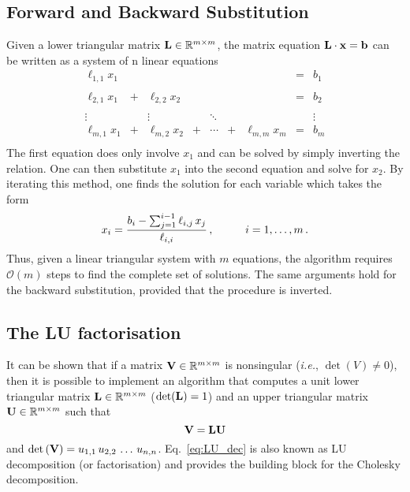 \subsection*{Forward and Backward Substitution}
Given a lower triangular matrix $\mathbf{L} \in \mathbb{R}^{m \times m}$, the matrix equation $\mathbf{L} \cdot \mathbf{x} = \mathbf{b}$ can be written as a system of n linear equations
\begin{equation}
\begin{matrix}
  \ell_{1,1} x_1 &   &                &   &        &   &                & = &    b_1 \\\\
  \ell_{2,1} x_1 & + & \ell_{2,2} x_2 &   &        &   &                & = &    b_2 \\\\
          \vdots &   &         \vdots &   & \ddots &   &                &   & \vdots \\
  \ell_{m,1} x_1 & + & \ell_{m,2} x_2 & + & \dotsb & + & \ell_{m,m} x_m & = &    b_m \\
\end{matrix}
\end{equation}
The first equation does only involve $x_1$ and can be solved by simply inverting the relation. One can then substitute $x_1$ into the second equation and solve for $x_2$. By iterating this method, one finds the solution for each variable which takes the form
\begin{equation}
    x_i = \frac{b_i - \sum_{j=1}^{i-1}\ell_{i,j}\,x_j}{\ell_{i,i}}\,, \hspace{10mm} i=1, \dots, m\,.
\end{equation}
Thus, given a linear triangular system with $m$ equations, the algorithm requires $\mathcal{O}(m)$ steps to find the complete set of solutions. The same arguments hold for the backward substitution, provided that the procedure is inverted.

\subsection*{The LU factorisation}
It can be shown that if a matrix $\mathbf{V} \in \mathbb{R}^{m\times m}$ is nonsingular (\textit{i.e.}, $\det (V) \neq 0$), then it is possible to implement an algorithm that computes a unit lower triangular matrix $\mathbf{L} \in \mathbb{R}^{m\times m}$ ($\det (\mathbf{L}) =1$) and an upper triangular matrix $\mathbf{U} \in  \mathbb{R}^{m\times m}$ such that 
\begin{equation}
    \mathbf{V} = \mathbf{L} \mathbf{U} 
    \label{eq:LU_dec}
\end{equation}
and $\det\left( \mathbf{V} \right) = u_{1,1} \, u_{2,2} \, \dots \, u_{n,n} $. Eq.~\eqref{eq:LU_dec} is also known as LU decomposition (or factorisation) and provides the building block for the Cholesky decomposition.

